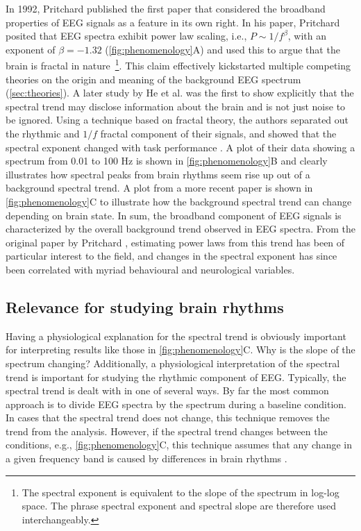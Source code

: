 In 1992, Pritchard \cite{Pritchard1992} published the first paper that considered the broadband properties of EEG signals as a feature in its own right. In his paper, Pritchard posited that EEG spectra exhibit power law scaling, i.e., $P\sim1/f^\beta$, with an exponent of $\beta=-1.32$ (\autoref{fig:phenomenology}A) and used this to argue that the brain is fractal in nature~\footnote[2]{The spectral exponent is equivalent to the slope of the spectrum in log-log space. The phrase spectral exponent and spectral slope are therefore used interchangeably.}. This claim effectively kickstarted multiple competing theories on the origin and meaning of the background EEG spectrum (\autoref{sec:theories}). A later study by He et al. \cite{He2010} was the first to show explicitly that the spectral trend may disclose information about the brain and is not just noise to be ignored. Using a technique based on fractal theory, the authors separated out the rhythmic and $1/f$ fractal component of their signals, and showed that the spectral exponent changed with task performance \cite{He2010}. A plot of their data showing a spectrum from 0.01 to 100 \unit{\hertz} is shown in \autoref{fig:phenomenology}B and clearly illustrates how spectral peaks from brain rhythms seem rise up out of a background spectral trend. A plot from a more recent paper \cite{Colombo2019} is shown in \autoref{fig:phenomenology}C to illustrate how the background spectral trend can change depending on brain state. In sum, the broadband component of EEG signals is characterized by the overall background trend observed in EEG spectra. From the original paper by Pritchard \cite{Pritchard1992}, estimating power laws from this trend has been of particular interest to the field, and changes in the spectral exponent has since been correlated with myriad behavioural and neurological variables.

\subsection{Relevance for studying brain rhythms} \label{sec:detrending}
Having a physiological explanation for the spectral trend is obviously important for interpreting results like those in \autoref{fig:phenomenology}C. Why is the slope of the spectrum changing?
Additionally, a physiological interpretation of the spectral trend is important for studying the rhythmic component of EEG. Typically, the spectral trend is dealt with in one of several ways. By far the most common approach is to divide EEG spectra by the spectrum during a baseline condition. In cases that the spectral trend does not change, this technique removes the trend from the analysis. However, if the spectral trend changes between the conditions, e.g., \autoref{fig:phenomenology}C, this technique assumes that any change in a given frequency band is caused by differences in brain rhythms \cite{Gerster2022}.

